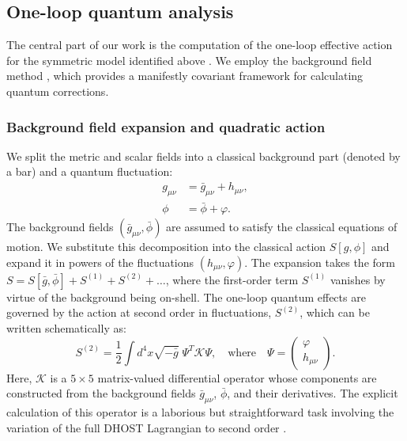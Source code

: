 \documentclass[twocolumn]{aastex631}
\begin{document}
\subsection{One-loop quantum analysis}
The central part of our work is the computation of the one-loop effective action for the symmetric model identified above \citep{buchbinder1998backgroundfieldmethodstructure,balitsky2025backgroundfieldmethodqcdfactorization,cerne2026nonlocalcorrectionsscalarfield}. We employ the background field method \citep{buchbinder1997backgroundfieldmethodn,buchbinder1998backgroundfieldmethodstructure,quadri2021backgroundfieldmethodgeneralized,balitsky2025backgroundfieldmethodqcdfactorization}, which provides a manifestly covariant framework for calculating quantum corrections.

\subsubsection{Background field expansion and quadratic action}
We split the metric and scalar fields into a classical background part (denoted by a bar) and a quantum fluctuation: \citep{almeida2024effectsquantumfluctuationsmetric}
\begin{align}g_{\mu\nu} &= \bar{g}_{\mu\nu} + h_{\mu\nu}, \\ \phi &= \bar{\phi} + \varphi.\end{align}
\citep{dolgov2023mixingscalartensormetric} The background fields $(\bar{g}_{\mu\nu}, \bar{\phi})$ are assumed to satisfy the classical equations of motion. We substitute this decomposition into the classical action $S[g, \phi]$ and expand it in powers of the fluctuations $(h_{\mu\nu}, \varphi)$. The expansion takes the form $S = S[\bar{g}, \bar{\phi}] + S^{(1)} + S^{(2)} + \dots$, where the first-order term $S^{(1)}$ vanishes by virtue of the background being on-shell. The one-loop quantum effects are governed by the action at second order in fluctuations, $S^{(2)}$, which can be written schematically as:
\begin{equation}S^{(2)} = \frac{1}{2} \int d^4x \sqrt{-\bar{g}} \; \Psi^T \mathcal{K} \Psi, \quad \text{where} \quad \Psi = \begin{pmatrix} \varphi \\ h_{\mu\nu} \end{pmatrix}. \end{equation}
\citep{kouranbaeva1999secondordermultisymplecticfieldtheory,reall2021causalitygravitationaltheoriessecond,canevarolo2024gradientcorrectionsquantumeffective} Here, $\mathcal{K}$ is a $5 \times 5$ matrix-valued differential operator whose components are constructed from the background fields $\bar{g}_{\mu\nu}$, $\bar{\phi}$, and their derivatives. The explicit calculation of this operator is a laborious but straightforward task involving the variation of the full DHOST Lagrangian to second order \citep{zhu2021scalartensorperturbationsdhost,achour2024nonlineargravitationalwaveshorndeski}.
\end{document}
